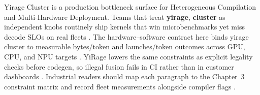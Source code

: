 Yirage Cluster is a production bottleneck surface for Heterogeneous Compilation and Multi-Hardware Deployment. Teams that treat \textbf{yirage}, \textbf{cluster} as independent knobs routinely ship kernels that win microbenchmarks yet miss decode SLOs on real fleets \citep{kwon2023vllm,patel2025llminference}. The hardware--software contract here binds yirage cluster to measurable bytes/token and launches/token outcomes across GPU, CPU, and NPU targets \citep{nvidia2024cudagraphs,taxbreak2026}. YiRage lowers the same constraints as explicit legality checks before codegen, so illegal fusion fails in CI rather than in customer dashboards \citep{liu2024deepseekv3,memoryfloor2026}. Industrial readers should map each paragraph to the Chapter~3 constraint matrix and record fleet measurements alongside compiler flags \citep{patel2025llminference,nvidia2022hopper}.

